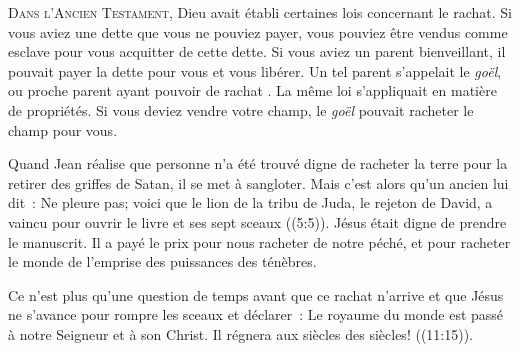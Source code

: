 \dvrule







\lettrine{D}{ans l'Ancien Testament,}
 Dieu avait établi certaines lois concernant le rachat.
 Si vous aviez une dette que vous ne pouviez payer,
 vous pouviez être vendus comme esclave pour vous acquitter
 de cette dette. Si vous aviez un parent bienveillant,
 il pouvait payer la dette pour vous et vous libérer.
 Un tel parent s'appelait le \emph{goël}, 
 ou \og proche parent ayant pouvoir de rachat \fg{}.
 La même loi s'appliquait en matière de propriétés.
 Si vous deviez vendre votre champ, le \emph{goël}
 pouvait racheter le champ pour vous. 

Quand Jean réalise que personne n'a été trouvé digne de racheter
 la terre pour la retirer des griffes de Satan, il se met à sangloter.
 Mais c'est alors qu'un ancien lui dit~: 
 \og Ne pleure pas; voici que le lion de la tribu de Juda,
 le rejeton de David, a vaincu pour ouvrir le livre et ses sept sceaux \fg{}
 ((5:5)).
 Jésus était digne de prendre le manuscrit. Il a payé le prix
 pour nous racheter de notre péché, et pour racheter le monde
 de l'emprise des puissances des ténèbres. 


Ce n'est plus qu'une question de temps avant que ce rachat n'arrive
 et que Jésus ne s'avance pour rompre les sceaux et déclarer~: 
 \og Le royaume du monde est passé à notre Seigneur et à son Christ.
 Il régnera aux siècles des siècles! \fg{} ((11:15)). 

\dvrule



